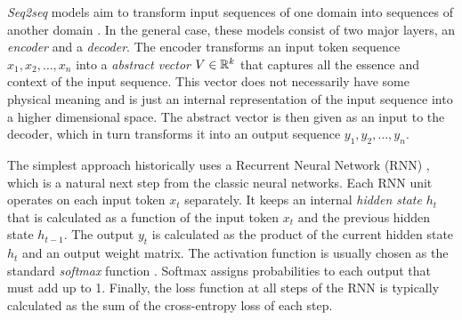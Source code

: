 
\emph{Seq2seq} models aim to transform input sequences of one domain into
sequences of another domain \citep{Sutskever_2014}. In the general case, these
models consist of two major layers, an \emph{encoder} and a \emph{decoder}. The
encoder transforms an input token sequence $x_1, x_2, \dots, x_n$ into a
\emph{abstract vector} $V \in \mathbb{R}^k$ that captures all the essence and context of
the input sequence. This vector does not necessarily have some physical meaning
and is just an internal representation of the input sequence into a higher
dimensional space. The abstract vector is then given as an input to the decoder,
which in turn transforms it into an output sequence $y_1, y_2, \dots, y_n$.


The simplest approach historically uses a Recurrent Neural Network (RNN)
\citep{Rumelhart1986, Werbos1990}, which is a natural next step from the classic
neural networks. Each RNN unit operates on each input token $x_t$ separately. It
keeps an internal \emph{hidden state} $h_t$ that is calculated as
a function of the input token $x_t$ and the previous hidden state $h_{t-1}$.
The output $y_t$ is calculated as
the product of the current hidden state $h_t$ and an output weight matrix. The
activation function is usually chosen as the standard \emph{softmax} function
\citep{Goodfellow-et-al-2016, Bishop-book-2006}. Softmax assigns probabilities
to each output that must add up to 1.
Finally, the loss function at all steps of the RNN is typically calculated as
the sum of the cross-entropy loss of each step.

